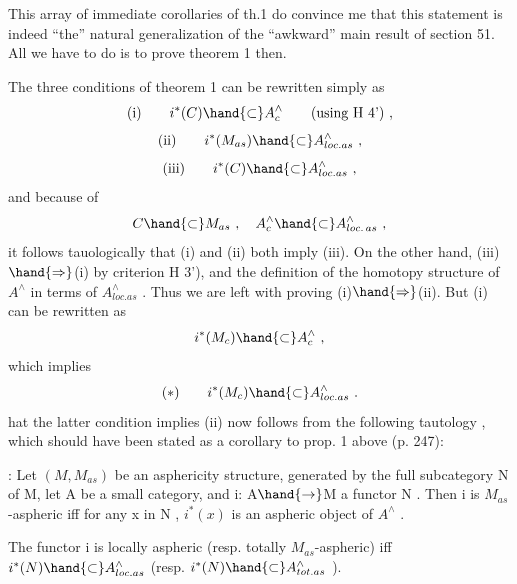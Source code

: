 
This array of immediate corollaries of th.1 do convince me that this
statement is indeed ``the'' natural generalization of the ``awkward'' main
result of section 51. All we have to do is to prove theorem 1 then.

The three conditions of theorem 1 can be rewritten simply as
\[ \text{(i)} \qquad i^{*}(C) \hand{\subset} A^{\wedge}_{c} \qquad \text{(using H 4')} \ , \]
\[ \text{(ii)} \qquad i^{*}(M_{as}) \hand{\subset} A^{\wedge}_{loc.as} \ , \]
\[ \text{(iii)} \qquad i^{*}(C) \hand{\subset} A^{\wedge}_{loc.as} \ , \]
and because of
\[ C \hand{\subset} M_{as} \ , \quad A^{\wedge}_{c} \hand{\subset} A^{\wedge}_{loc.\,as} \ , \]
it follows tauologically that (i) and (ii) both imply (iii). On the
other hand, (iii)$\hand{\Rightarrow}$(i) by criterion H 3'), and the definition of the
homotopy  structure of $A^{\wedge}$ in terms of  $A^{\wedge}_{loc.as}$ . Thus
we are left with proving (i)$\hand{\Rightarrow}$(ii). But (i) can be rewritten as
\[ i^{*}(M_{c}) \hand{\subset} A^{\wedge}_{c} \ , \]
which implies
\[ (*) \qquad i^{*}(M_{c}) \hand{\subset} A^{\wedge}_{loc.as} \ . \]
 hat the latter condition implies (ii)
 now follows from the  following tautology , which should
have been stated as a corollary to prop. 1 above (p. 247):

\hand{\uline{\textcolor{black}{Lemma}}}: Let $(M,M_{as})$ be an asphericity structure, generated by the full
subcategory N of M, let A be a small category, and i: A$\hand{\rightarrow}$M a functor
 N . Then  i is $M_{as}$-aspheric iff for any x in N ,
$i^{*}(x)$ is an aspheric object of $A^{\wedge}$ .

\hand{\uline{\textcolor{black}{Corollary}}} The functor i is locally  aspheric (resp. totally $M_{as}$-aspheric)
iff  $i^{*}(N) \hand{\subset} A^{\wedge}_{loc.as}$ (resp. $i^{*}(N) \hand{\subset} A^{\wedge}_{tot.as}$ ).


